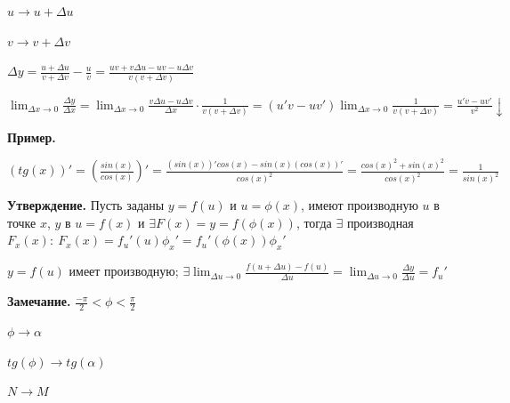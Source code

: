 \documentclass{article}
\begin{document}
\begin{enumerate}
            \( u \to u + \Delta u \)

            \( v \to v + \Delta v \)

            \( \Delta y = \frac{u + \Delta u}{v + \Delta v} - \frac{u}{v} = \frac{uv + v\Delta u - uv - u\Delta v}{v(v + \Delta v)} \)
            
            \(\lim_{\Delta x \to 0}{\frac{\Delta y}{\Delta x}} = \lim_{\Delta x \to 0}{\frac{v\Delta u - u\Delta v}{\Delta x} \cdot \frac{1}{v(v+\Delta v)}} = (u'v - uv')\lim_{\Delta x \to 0}{\frac{1}{v(v+\Delta v)}} = \frac{u'v - uv'}{v^2}\downarrow\)
        
            \textbf{Пример.}
            
            \( (tg(x))' = (\frac{sin(x)}{cos(x)})' = \frac{(sin(x))'cos(x) - sin(x)(cos(x))'}{cos(x)^2} = \frac{cos(x)^2 + sin(x)^2}{cos(x)^2} = \frac{1}{sin(x)^2} \)
    \end{enumerate}
    
    \textbf{Утверждение.} Пусть заданы \( y = f(u) \) и \( u = \phi(x) \), имеют производную \(u\) в точке \(x\), \(y\) в \(u = f(x)\) и \( \exists F(x) = y = f(\phi(x)) \), тогда \(\exists\) производная \(F_x(x):\ F_x(x) = f_u'(u)\phi_x' = f_u'(\phi(x))\phi_x' \)
    
    \(y = f(u)\) имеет производную; \(\exists \lim_{\Delta u \to 0}{\frac{f(u+\Delta u) - f(u)}{\Delta u}} = \lim_{\Delta u \to 0}{\frac{\Delta y}{\Delta u}} = f_u'\)

    \textbf{Замечание.}
    \( \frac{-\pi}{2} < \phi < \frac{\pi}{2} \)

    \( \phi \to \alpha \)

    \( tg(\phi) \to tg(\alpha) \)

    \( N \to M \)
\end{document}
